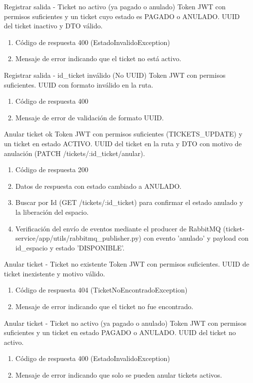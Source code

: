 {Registrar salida - Ticket no activo (ya pagado o anulado)}
{Token JWT con permisos suficientes y un ticket cuyo estado es PAGADO o ANULADO.}
{UUID del ticket inactivo y DTO válido.}
{\begin{enumerate} [leftmargin=*, nosep]
    \item Código de respuesta 400 (EstadoInvalidoException)
    \item Mensaje de error indicando que el ticket no está activo.
\end{enumerate}}

{Registrar salida - id\_ticket inválido (No UUID)}
{Token JWT con permisos suficientes.}
{UUID con formato inválido en la ruta.}
{\begin{enumerate} [leftmargin=*, nosep]
    \item Código de respuesta 400
    \item Mensaje de error de validación de formato UUID.
\end{enumerate}}

{Anular ticket ok}
{Token JWT con permisos suficientes (TICKETS\_UPDATE) y un ticket en estado ACTIVO.}
{UUID del ticket en la ruta y DTO con motivo de anulación (PATCH /tickets/:id\_ticket/anular).}
{\begin{enumerate} [leftmargin=*, nosep]
    \item Código de respuesta 200
    \item Datos de respuesta con estado cambiado a ANULADO.
    \item Buscar por Id (GET /tickets/:id\_ticket) para confirmar el estado anulado y la liberación del espacio.
    \item Verificación del envío de eventos mediante el producer de RabbitMQ (ticket-service/app/utils/rabbitmq\_publisher.py) con evento 'anulado' y payload con id\_espacio y estado 'DISPONIBLE'.
\end{enumerate}}

{Anular ticket - Ticket no existente}
{Token JWT con permisos suficientes.}
{UUID de ticket inexistente y motivo válido.}
{\begin{enumerate} [leftmargin=*, nosep]
    \item Código de respuesta 404 (TicketNoEncontradoException)
    \item Mensaje de error indicando que el ticket no fue encontrado.
\end{enumerate}}

{Anular ticket - Ticket no activo (ya pagado o anulado)}
{Token JWT con permisos suficientes y un ticket en estado PAGADO o ANULADO.}
{UUID del ticket no activo.}
{\begin{enumerate} [leftmargin=*, nosep]
    \item Código de respuesta 400 (EstadoInvalidoException)
    \item Mensaje de error indicando que solo se pueden anular tickets activos.
\end{enumerate}}

